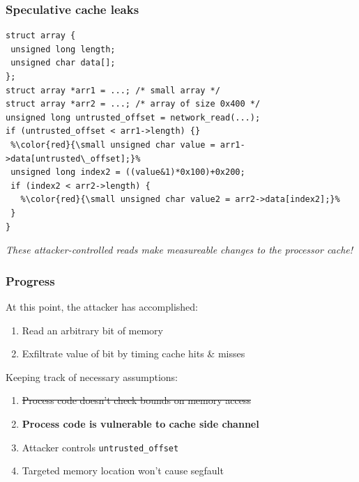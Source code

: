 \documentclass[10pt,handout]{beamer}
\begin{document}

\begin{frame}[fragile]

\frametitle{Speculative cache leaks}

\begin{lstlisting}[basicstyle=\small,style=customjava]
struct array {
 unsigned long length;
 unsigned char data[];
};
struct array *arr1 = ...; /* small array */
struct array *arr2 = ...; /* array of size 0x400 */
unsigned long untrusted_offset = network_read(...);
if (untrusted_offset < arr1->length) {}
 %\color{red}{\small unsigned char value = arr1->data[untrusted\_offset];}%
 unsigned long index2 = ((value&1)*0x100)+0x200;
 if (index2 < arr2->length) {
   %\color{red}{\small unsigned char value2 = arr2->data[index2];}%
 }
}
\end{lstlisting}

\begin{center}
\emph{These attacker-controlled reads make measureable changes to the processor cache!}
\end{center}

\end{frame}


\begin{frame}

\frametitle{Progress}

At this point, the attacker has accomplished:
\begin{enumerate}
  \item Read an arbitrary bit of memory
  \item Exfiltrate value of bit by timing cache hits \& misses \\[1em]
\end{enumerate}

Keeping track of necessary assumptions:
\begin{enumerate}
  \item \sout{Process code doesn't check bounds on memory access}
  \item \textbf{Process code is vulnerable to cache side channel}
  \item Attacker controls \texttt{untrusted\_offset}
  \item Targeted memory location won't cause segfault
\end{enumerate}

\end{frame}
\end{document}
